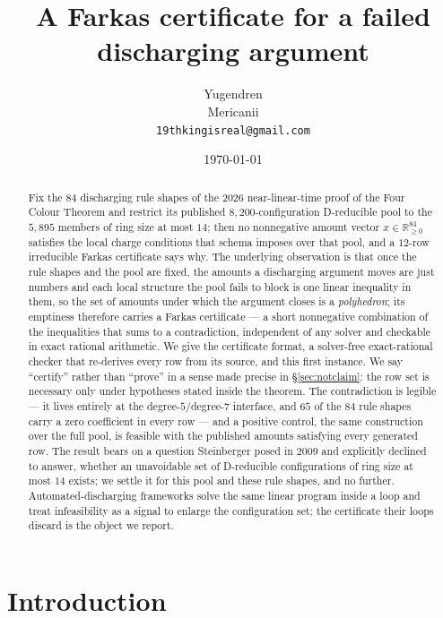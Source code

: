 \documentclass[11pt]{article}
\title{A Farkas certificate for a failed discharging argument}
\author{%
  Yugendren\\
  \small Mericanii\\
  \small\texttt{19thkingisreal@gmail.com}%
}
\date{\today}
\theoremstyle{definition}
\begin{document}
\sloppy
\maketitle

\begin{abstract}
Fix the $84$ discharging rule shapes of the $2026$ near-linear-time proof of the
Four Colour Theorem \cite{nl4ct2026} and restrict its published
$8{,}200$-configuration D-reducible pool to the $5{,}895$ members of ring size at
most $14$; then no nonnegative amount vector $x\in\mathbb{R}^{84}_{\ge0}$
satisfies the local charge conditions that schema imposes over that pool, and a
$12$-row irreducible Farkas certificate says why. The underlying observation is
that once the rule shapes and the pool are fixed, the amounts a discharging
argument moves are just numbers and each local structure the pool fails to block
is one linear inequality in them, so the set of amounts under which the argument
closes is a \emph{polyhedron}; its emptiness therefore carries a Farkas
certificate --- a short nonnegative combination of the inequalities that sums to
a contradiction, independent of any solver and checkable in exact rational
arithmetic. We give the certificate format, a solver-free exact-rational checker
that re-derives every row from its source, and this first instance. We say
``certify'' rather than ``prove'' in a sense made precise in
\S\ref{sec:notclaim}: the row set is necessary only under hypotheses stated
inside the theorem. The contradiction is legible --- it lives entirely at the
degree-$5$/degree-$7$ interface, and $65$ of the $84$ rule shapes carry a zero
coefficient in every row --- and a positive control, the same construction over
the full pool, is feasible with the published amounts satisfying every generated
row. The result bears on a question Steinberger \cite{steinberger2010} posed in
$2009$ and explicitly declined to answer, whether an unavoidable set of
D-reducible configurations of ring size at most $14$ exists; we settle it for
this pool and these rule shapes, and no further. Automated-discharging
frameworks \cite{stolee2014,bousquet2024square,lavalicov2022} solve the same
linear program inside a loop and treat infeasibility as a signal to enlarge the
configuration set; the certificate their loops discard is the object we report.
\end{abstract}
\section{Introduction}
\label{sec:intro}
\end{document}
